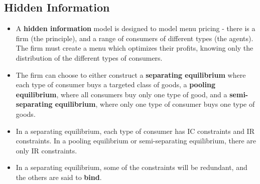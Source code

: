 \documentclass[a4paper]{article}
\begin{document}
\subsection{Hidden Information}
\begin{itemize}
    \item A \textbf{hidden information} model is designed to model menu pricing - there is a firm (the principle), and a range of consumers of different types (the agents). The firm must create a menu which optimizes their profits, knowing only the distribution of the different types of consumers.
    \item The firm can choose to either construct a \textbf{separating equilibrium} where each type of consumer buys a targeted class of goods, a \textbf{pooling equilibrium}, where all consumers buy only one type of good, and a \textbf{semi-separating equilibrium}, where only one type of consumer buys one type of goods.
    \item In a separating equilibrium, each type of consumer has IC constraints and IR constraints. In a pooling equilibrium or semi-separating equilibrium, there are only IR constraints.
    \item In a separating equilibrium, some of the constraints will be redundant, and the others are said to \textbf{bind}.
\end{itemize}
\end{document}
